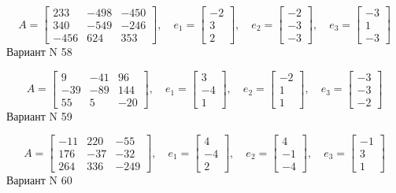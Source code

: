 \documentclass[11pt]{report}
\begin{document}
$$A = \left[\begin{matrix}233 & -498 & -450\\340 & -549 & -246\\-456 & 624 & 353\end{matrix}\right],\quad e_1 = \left[\begin{matrix}-2\\3\\2\end{matrix}\right],\quad e_2 = \left[\begin{matrix}-2\\-3\\-3\end{matrix}\right],\quad e_3 = \left[\begin{matrix}-3\\1\\-3\end{matrix}\right]$$Вариант N 58

$$A = \left[\begin{matrix}9 & -41 & 96\\-39 & -89 & 144\\55 & 5 & -20\end{matrix}\right],\quad e_1 = \left[\begin{matrix}3\\-4\\1\end{matrix}\right],\quad e_2 = \left[\begin{matrix}-2\\1\\1\end{matrix}\right],\quad e_3 = \left[\begin{matrix}-3\\-3\\-2\end{matrix}\right]$$Вариант N 59

$$A = \left[\begin{matrix}-11 & 220 & -55\\176 & -37 & -32\\264 & 336 & -249\end{matrix}\right],\quad e_1 = \left[\begin{matrix}4\\-4\\2\end{matrix}\right],\quad e_2 = \left[\begin{matrix}4\\-1\\-4\end{matrix}\right],\quad e_3 = \left[\begin{matrix}-1\\3\\1\end{matrix}\right]$$Вариант N 60
\end{document}
